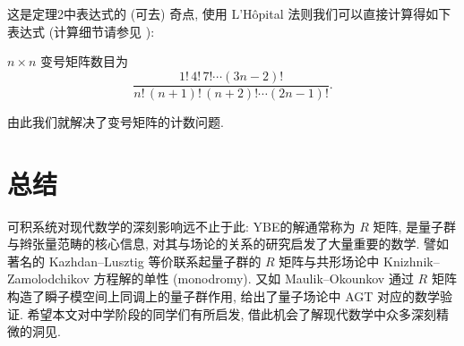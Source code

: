 \documentclass[twoside]{article}
\begin{document}
这是定理2中表达式的 (可去) 奇点, 
使用 L'H\^opital 法则我们可以直接计算得如下表达式
(计算细节请参见 \cite{10.1155/S1073792896000128}): 
\begin{theorem}
$n\times n$ 变号矩阵数目为
\[ 
    \frac{1! \, 4! \, 7! \cdots (3n-2)!}{n! \, (n+1)! \, (n+2)! \cdots (2n-1)!}. 
\]
\end{theorem}
由此我们就解决了变号矩阵的计数问题. 

\section{总结}
可积系统对现代数学的深刻影响远不止于此: 
YBE的解通常称为 $R$ 矩阵, 
是量子群与辫张量范畴的核心信息, 
对其与场论的关系的研究启发了大量重要的数学. 
譬如著名的 Kazhdan--Lusztig 等价联系起量子群的 $R$ 矩阵与共形场论中
Knizhnik--Zamolodchikov 方程解的单性 (monodromy). 
又如 Maulik--Okounkov 通过 $R$ 矩阵构造了瞬子模空间上同调上的量子群作用, 
给出了量子场论中 AGT 对应的数学验证. 
希望本文对中学阶段的同学们有所启发, 
借此机会了解现代数学中众多深刻精微的洞见. 

\printbibliography
\end{document}
